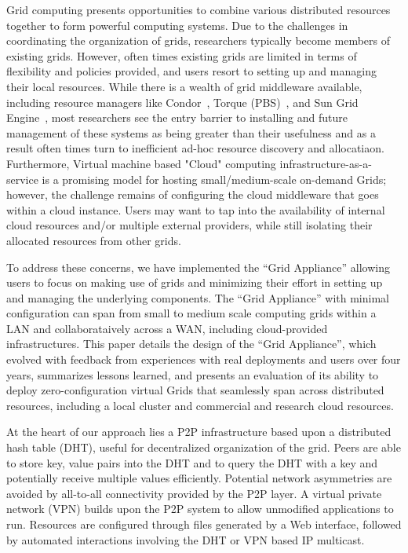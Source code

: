 \documentclass[conference]{IEEEtran}
\begin{document}
Grid computing presents opportunities to combine various distributed resources
together to form powerful computing systems.  Due to the challenges in
coordinating the organization of grids, researchers typically become members of
existing grids. However, often times existing grids are limited in terms of
flexibility and policies provided, and users resort to setting up and managing
their local resources.  While there is a wealth of grid middleware available,
including resource managers like Condor~\cite{condor0}, Torque
(PBS)~\cite{torque}, and Sun Grid Engine~\cite{grid_engine}, most researchers
see the entry barrier to installing and future management of these systems as
being greater than their usefulness and as a result often times turn to
inefficient ad-hoc resource discovery and allocatiaon.  Furthermore, Virtual
machine based "Cloud" computing infrastructure-as-a-service is a promising
model for hosting small/medium-scale on-demand Grids; however, the challenge
remains of configuring the cloud middleware that goes within a cloud instance.
Users may want to tap into the availability of internal cloud resources and/or
multiple external providers, while still isolating their allocated resources
from other grids.

To address these concerns, we have implemented the ``Grid Appliance'' allowing
users to focus on making use of grids and minimizing their effort in setting up
and managing the underlying components.  The ``Grid Appliance'' with minimal
configuration can span from small to medium scale computing grids within a LAN
and collaborataively across a WAN, including cloud-provided infrastructures.
This paper details the design of the ``Grid Appliance'', which evolved with
feedback from experiences with real deployments and users over four years,
summarizes lessons learned, and presents an evaluation of its ability to deploy
zero-configuration virtual Grids that seamlessly span across distributed
resources, including a local cluster and commercial and research cloud
resources.

At the heart of our approach lies a P2P infrastructure based upon a distributed
hash table (DHT), useful for decentralized organization of the grid.  Peers are
able to store key, value pairs into the DHT and to query the DHT with a key and
potentially receive multiple values efficiently.  Potential network asymmetries
are avoided by all-to-all connectivity provided by the P2P layer.  A virtual
private network (VPN) builds upon the P2P system to allow unmodified
applications to run.  Resources are configured through files generated by a Web
interface, followed by automated interactions involving the DHT or VPN based IP
multicast.  
\end{document}
